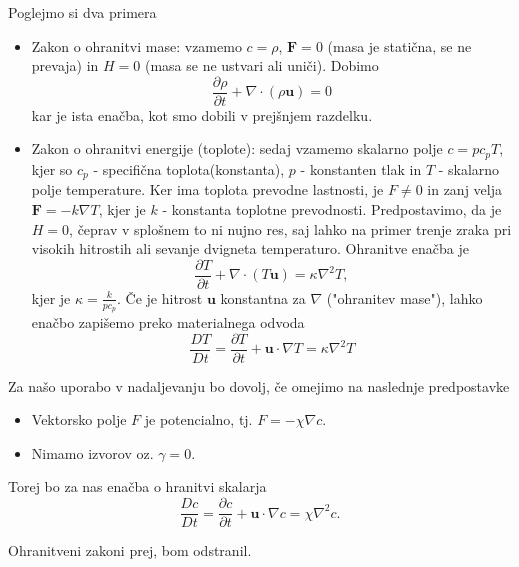 \documentclass[mat2, tisk]{fmfdelo}
\newcommand{\bd}{\textbf}
\begin{document}
Poglejmo si dva primera
\begin{primer}
  \hfil
\begin{itemize}
  \item Zakon o ohranitvi mase: vzamemo $c = \rho$, $\bd{F} = 0$ (masa je statična, se ne prevaja) in 
  $H = 0$ (masa se ne ustvari ali uniči). Dobimo
  $$
  \frac{\partial \rho}{\partial t} + \nabla \cdot (\rho \bd{u}) = 0
  $$
  kar je ista enačba, kot smo dobili v prejšnjem razdelku.
  \item Zakon o ohranitvi energije (toplote): sedaj vzamemo skalarno polje $c = pc_p T$, kjer 
  so $c_p$ - specifična toplota(konstanta), $p$ - konstanten tlak in $T$ - skalarno polje temperature. 
  Ker ima toplota prevodne lastnosti, je $F \neq 0$ in zanj velja $\bd{F} = -k\nabla T$, kjer je 
  $k$ - konstanta toplotne prevodnosti. Predpostavimo, da je $H = 0$, čeprav v splošnem to 
  ni nujno res, saj lahko na primer trenje zraka pri visokih hitrostih ali sevanje 
  dvigneta temperaturo. Ohranitve enačba je 
  \begin{equation}
  \frac{\partial T}{\partial t} + \nabla \cdot (T \bd{u}) = \kappa \nabla^2 T,
  \end{equation}
  kjer je $\kappa = \frac{k}{p c_p}$.
  Če je hitrost $\bd{u}$ konstantna za $\nabla$ ("ohranitev mase"), lahko enačbo zapišemo preko materialnega odvoda
  \begin{equation}
  \frac{D T}{D t} = \frac{\partial T}{\partial t} + \bd{u}\cdot\nabla T = \kappa \nabla^2 T
  \end{equation}
\end{itemize}
\end{primer}
Za našo uporabo v nadaljevanju bo dovolj, če omejimo na naslednje predpostavke
\begin{itemize}
  \item Vektorsko polje $F$ je potencialno, tj. $F = - \chi \nabla c$. 
  \item Nimamo izvorov oz. $\gamma = 0$.
\end{itemize}
Torej bo za nas enačba o hranitvi skalarja 
\begin{equation}
\frac{D c}{D t} = \frac{\partial c}{\partial t} + \bd{u}\cdot\nabla c = \chi \nabla^2 c.
\end{equation}


\newpage

Ohranitveni zakoni prej, bom odstranil.\\[5mm]
\end{document}
